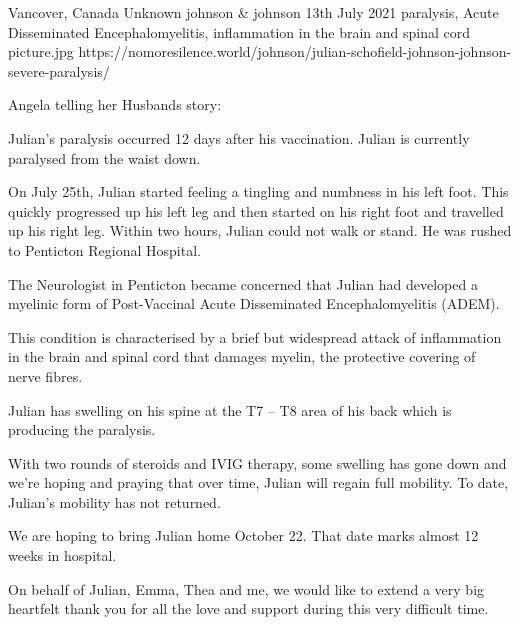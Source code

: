{Vancover, Canada}
{Unknown}
{johnson \& johnson}
{13th July 2021}
{paralysis,  Acute Disseminated Encephalomyelitis, inflammation in the brain and spinal cord}
{picture.jpg}
{https://nomoresilence.world/johnson/julian-schofield-johnson-johnson-severe-paralysis/}
{

Angela telling her Husbands story:

Julian’s paralysis occurred 12 days after his vaccination. Julian is currently
paralysed from the waist down.

On July 25th, Julian started feeling a tingling and numbness in his left
foot. This quickly progressed up his left leg and then started on his right foot
and travelled up his right leg. Within two hours, Julian could not walk or
stand. He was rushed to Penticton Regional Hospital.

The Neurologist in Penticton became concerned that Julian had developed a
myelinic form of Post-Vaccinal Acute Disseminated Encephalomyelitis (ADEM).

This condition is characterised by a brief but widespread attack of inflammation
in the brain and spinal cord that damages myelin, the protective covering of
nerve fibres.

Julian has swelling on his spine at the T7 – T8 area of his back which is
producing the paralysis.

With two rounds of steroids and IVIG therapy, some swelling has gone down and
we’re hoping and praying that over time, Julian will regain full mobility. To
date, Julian’s mobility has not returned.

We are hoping to bring Julian home October 22. That date marks almost 12 weeks
in hospital.

On behalf of Julian, Emma, Thea and me, we would like to extend a very big
heartfelt thank you for all the love and support during this very difficult
time.

}
